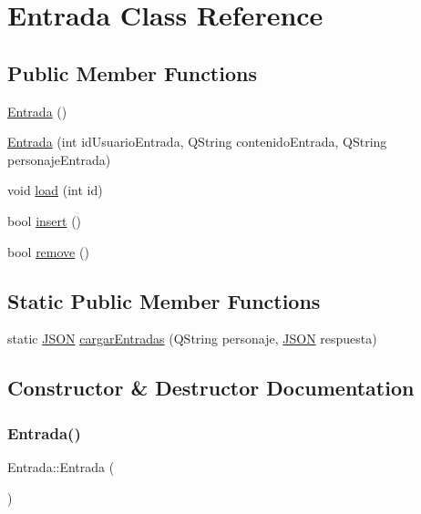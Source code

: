\hypertarget{classEntrada}{}\section{Entrada Class Reference}
\label{classEntrada}
\subsection*{Public Member Functions}
\begin{DoxyCompactItemize}
\item 
\mbox{\hyperlink{classEntrada_a318ba6d0848d21cd2cf37d8dd3a4399e}{Entrada}} ()
\item 
\mbox{\hyperlink{classEntrada_acf29eef7e8989a95a2dbd34a0845893c}{Entrada}} (int id\+Usuario\+Entrada, Q\+String contenido\+Entrada, Q\+String personaje\+Entrada)
\item 
void \mbox{\hyperlink{classEntrada_a1b4cadcad1ba9665c73b3515eaad16cc}{load}} (int id)
\item 
bool \mbox{\hyperlink{classEntrada_af6ef4854f5d9040117278ffe65eac8a3}{insert}} ()
\item 
bool \mbox{\hyperlink{classEntrada_a352b5c6fad6fe043a06625c995b78e32}{remove}} ()
\end{DoxyCompactItemize}
\subsection*{Static Public Member Functions}
\begin{DoxyCompactItemize}
\item 
static \mbox{\hyperlink{classnlohmann_1_1basic__json}{J\+S\+ON}} \mbox{\hyperlink{classEntrada_ab9b65851bf7c933598f980c00106bf1e}{cargar\+Entradas}} (Q\+String personaje, \mbox{\hyperlink{classnlohmann_1_1basic__json}{J\+S\+ON}} respuesta)
\end{DoxyCompactItemize}


\subsection{Constructor \& Destructor Documentation}
\mbox{\label{classEntrada_a318ba6d0848d21cd2cf37d8dd3a4399e}} 
\subsubsection{\texorpdfstring{Entrada()}{Entrada()}\hspace{0.1cm}{\footnotesize\ttfamily [1/2]}}
{\footnotesize\ttfamily Entrada\+::\+Entrada (\begin{DoxyParamCaption}{ }\end{DoxyParamCaption})}


